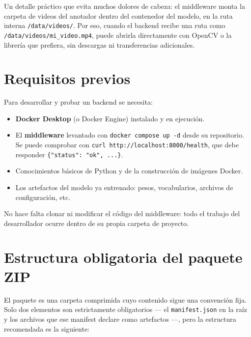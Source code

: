 \documentclass[12pt,a4paper]{article}
\begin{document}
Un detalle práctico que evita muchos dolores de cabeza: el middleware monta la carpeta de videos del anotador dentro del contenedor del modelo, en la ruta interna \texttt{/data/videos/}. Por eso, cuando el backend recibe una ruta como \texttt{/data/videos/mi\_video.mp4}, puede abrirla directamente con OpenCV o la librería que prefiera, sin descargas ni transferencias adicionales.

\section{Requisitos previos}

Para desarrollar y probar un backend se necesita:

\begin{itemize}[noitemsep, topsep=2pt]
    \item \textbf{Docker Desktop} (o Docker Engine) instalado y en ejecución.
    \item El \textbf{middleware} levantado con \texttt{docker compose up -d} desde su repositorio. Se puede comprobar con \texttt{curl http://localhost:8000/health}, que debe responder \texttt{\{"status": "ok", ...\}}.
    \item Conocimientos básicos de Python y de la construcción de imágenes Docker.
    \item Los artefactos del modelo ya entrenado: pesos, vocabularios, archivos de configuración, etc.
\end{itemize}

No hace falta clonar ni modificar el código del middleware: todo el trabajo del desarrollador ocurre dentro de su propia carpeta de proyecto.

\section{Estructura obligatoria del paquete ZIP}

El paquete es una carpeta comprimida cuyo contenido sigue una convención fija. Solo dos elementos son estrictamente obligatorios --- el \texttt{manifest.json} en la raíz y los archivos que ese manifest declare como artefactos ---, pero la estructura recomendada es la siguiente:
\end{document}
